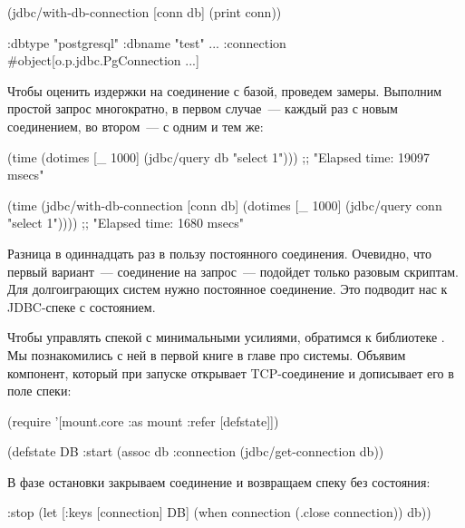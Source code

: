 \begin{english}
  \begin{clojure/lines}
(jdbc/with-db-connection [conn db]
  (print conn))

{:dbtype "postgresql"
 :dbname "test"
 ...
 :connection #object[o.p.jdbc.PgConnection ...]}
  \end{clojure/lines}
\end{english}

Чтобы оценить издержки на соединение с базой, проведем замеры. Выполним простой запрос многократно, в первом случае~--- каждый раз с новым соединением, во втором~--- с одним и тем же:

\begin{english}
  \begin{clojure}
(time (dotimes [_ 1000]
        (jdbc/query db "select 1")))
;; "Elapsed time: 19097 msecs"

(time
 (jdbc/with-db-connection [conn db]
   (dotimes [_ 1000]
     (jdbc/query conn "select 1"))))
;; "Elapsed time:  1680 msecs"
  \end{clojure}
\end{english}

Разница в одиннадцать раз в пользу постоянного соединения. Очевидно, что первый вариант~--- соединение на запрос~--- подойдет только разовым скриптам. Для долгоиграющих систем нужно постоянное соединение. Это подводит нас к JDBC-спеке с состоянием.

Чтобы управлять спекой с минимальными усилиями, обратимся к библиотеке . Мы познакомились с ней в первой книге в главе про системы. Объявим компонент, который при запуске открывает TCP-соединение и дописывает его в поле  спеки:


\begin{english}
  \begin{clojure}
(require
  '[mount.core :as mount :refer [defstate]])

(defstate DB
  :start
  (assoc db :connection
         (jdbc/get-connection db))
  \end{clojure}
\end{english}

В фазе остановки закрываем соединение и возвращаем спеку без состояния:

\begin{english}
  \begin{clojure}
  :stop
  (let [{:keys [connection]} DB]
    (when connection
      (.close connection))
    db))
  \end{clojure}
\end{english}

